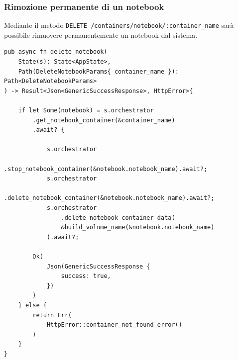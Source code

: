\subsubsection{Rimozione permanente di un notebook}
Mediante il metodo \verb|DELETE /containers/notebook/:container_name| sarà possibile rimuovere permanentemente un notebook dal sistema.
\begin{verbatim}
pub async fn delete_notebook(
    State(s): State<AppState>,
    Path(DeleteNotebookParams{ container_name }): Path<DeleteNotebookParams>
) -> Result<Json<GenericSuccessResponse>, HttpError>{

    if let Some(notebook) = s.orchestrator
        .get_notebook_container(&container_name)
        .await? {

            s.orchestrator
                .stop_notebook_container(&notebook.notebook_name).await?;
            s.orchestrator
                .delete_notebook_container(&notebook.notebook_name).await?;
            s.orchestrator
                .delete_notebook_container_data(
                &build_volume_name(&notebook.notebook_name)
            ).await?;
    
        Ok(
            Json(GenericSuccessResponse {
                success: true,
            })
        )
    } else {
        return Err(
            HttpError::container_not_found_error()
        )
    }
}

\end{verbatim}
\newpage
